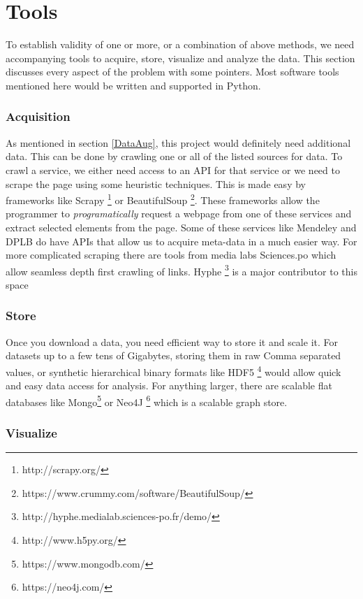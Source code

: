 \documentclass[a4paper]{article}
\begin{document}
\section{Tools}
To establish validity of one or more, or a combination of above methods, we need accompanying tools to acquire, store, visualize and analyze the data. This section discusses every aspect of the problem with some pointers. Most software tools mentioned here would be written and supported in Python.

\subsubsection{Acquisition}
As mentioned in section \ref{DataAug}, this project would definitely need additional data. This can be done by crawling one or all of the listed sources for data. To crawl a service, we either need access to an API for that service or we need to scrape the page using some heuristic techniques. This is made easy by frameworks like Scrapy \footnote{http://scrapy.org/} or BeautifulSoup \footnote{https://www.crummy.com/software/BeautifulSoup/}. These frameworks allow the programmer to \textit{programatically} request a webpage from one of these services and extract selected elements from the page. Some of these services like Mendeley and DPLB do have APIs that allow us to acquire meta-data in a much easier way. For more complicated scraping there are tools from media labs Sciences.po which allow seamless depth first crawling of links. Hyphe \footnote{http://hyphe.medialab.sciences-po.fr/demo/} is a major contributor to this space 

\subsubsection{Store}

Once you download a data, you need efficient way to store it and scale it. For datasets up to a few tens of Gigabytes, storing them in raw Comma separated values, or synthetic hierarchical binary formats like HDF5 \footnote{http://www.h5py.org/} would allow quick and easy data access for analysis. For anything larger, there are scalable flat databases like Mongo\footnote{https://www.mongodb.com/} or Neo4J \footnote{https://neo4j.com/} which is a scalable graph store. 

\subsubsection{Visualize}
\end{document}
